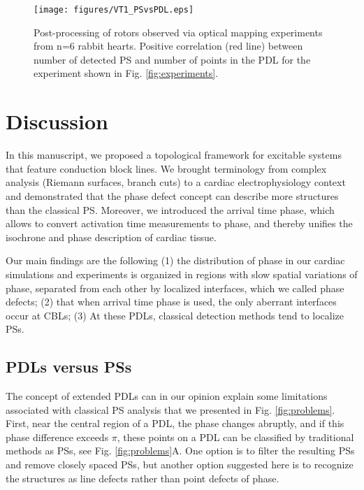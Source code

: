 \documentclass{article}
\begin{document}
\begin{figure}[htp]
\centering
\texttt{[image: figures/VT1\_PSvsPDL.eps]}
\caption{Post-processing of rotors observed via optical mapping experiments from n=6 rabbit hearts. %
Positive correlation (red line) between number of detected PS and number of points in the PDL for the experiment shown in Fig. \ref{fig:experiments}. \label{fig:post}
}
\end{figure}

\section{Discussion}\label{sec:discussion}

In this manuscript, we proposed a topological framework for excitable systems that feature conduction block lines. We brought terminology from complex analysis (Riemann surfaces, branch cuts) to a cardiac electrophysiology context and demonstrated that the phase defect concept can describe more structures than the classical PS. Moreover, we introduced the arrival time phase, which allows to convert activation time measurements to phase, and thereby unifies the isochrone and phase description of cardiac tissue. 

Our main findings are the following (1) the distribution of phase in our cardiac simulations and experiments is organized in regions with slow spatial variations of phase, separated from each other by localized interfaces, which we called phase defects; (2) that when arrival time phase is used, the only aberrant interfaces occur at CBLs; (3) At these PDLs, classical detection methods tend to localize PSs. 

\subsection{PDLs versus PSs}

The concept of extended PDLs can in our opinion explain some limitations associated with classical PS analysis that we presented in Fig. \ref{fig:problems}. First, near the central region of a PDL, the phase changes abruptly, and if this phase difference exceeds $\pi$, these points on a PDL can be classified by traditional methods as PSs, see Fig. \ref{fig:problems}A. One option is to filter the resulting PSs and remove closely spaced PSs, but another option suggested here is to recognize the structures as line defects rather than point defects of phase.  
\end{document}
